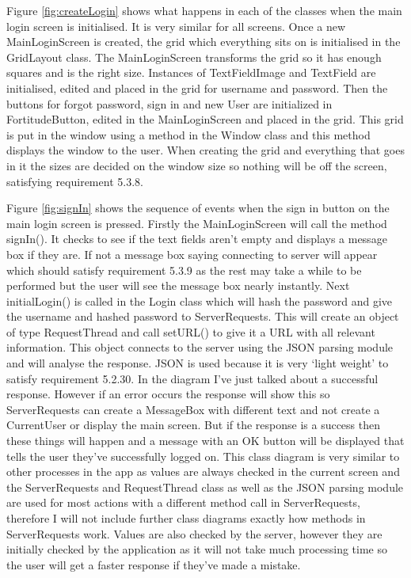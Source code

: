 Figure \ref{fig:createLogin} shows what happens in each of the classes when the main login screen is initialised. It is very similar for all screens. Once a new MainLoginScreen is created, the grid which everything sits on is initialised in the GridLayout class. The MainLoginScreen transforms the grid so it has enough squares and is the right size. Instances of TextFieldImage and TextField are initialised, edited and placed in the grid for username and password. Then the buttons for forgot password, sign in and new User are initialized in FortitudeButton, edited in the MainLoginScreen and placed in the grid. This grid is put in the window using a method in the Window class and this method displays the window to the user. When creating the grid and everything that goes in it the sizes are decided on the window size so nothing will be off the screen, satisfying requirement 5.3.8.

Figure \ref{fig:signIn} shows the sequence of events when the sign in button on the main login screen is pressed. Firstly the MainLoginScreen will call the method signIn(). It checks to see if the text fields aren't empty and displays a message box if they are. If not a message box saying connecting to server will appear which should satisfy requirement 5.3.9 as the rest may take a while to be performed but the user will see the message box nearly instantly. Next initialLogin() is called in the Login class which will hash the password and give the username and hashed password to ServerRequests. This will create an object of type RequestThread and call setURL() to give it a URL with all relevant information. This object connects to the server using the JSON parsing module and will analyse the response. JSON is used because it is very `light weight' to satisfy requirement 5.2.30. In the diagram I've just talked about a successful response. However if an error occurs the response will show this so ServerRequests can create a MessageBox with different text and not create a CurrentUser or display the main screen. But if the response is a success then these things will happen and a message with an OK button will be displayed that tells the user they've successfully logged on. This class diagram is very similar to other processes in the app as values are always checked in the current screen and the ServerRequests and RequestThread class as well as the JSON parsing module are used for most actions with a different method call in ServerRequests, therefore I will not include further class diagrams exactly how methods in ServerRequests work. Values are also checked by the server, however they are initially checked by the application as it will not take much processing time so the user will get a faster response if they've made a mistake.

